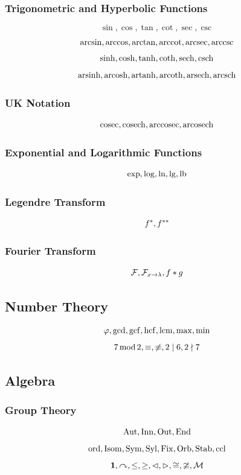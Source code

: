 \documentclass{article}
\begin{document}
\subsubsection{Trigonometric and Hyperbolic Functions}
\[
    \sin, \cos, \tan, \cot, \sec, \csc
\]
\[
    \arcsin, \arccos, \arctan, \arccot, \arcsec, \arccsc
\]
\[
    \sinh, \cosh, \tanh, \coth, \sech, \csch
\]
\[
    \operatorname{arsinh}, \operatorname{arcosh}, \operatorname{artanh}, \operatorname{arcoth}, \operatorname{arsech}, \operatorname{arcsch}
\]

\subsubsection{UK Notation}
\[
    \operatorname{cosec}, \operatorname{cosech}, \operatorname{arccosec}, \operatorname{arcosech}
\]

\subsubsection{Exponential and Logarithmic Functions}
\[
    \exp, \log, \ln, \lg, \operatorname{lb}
\]

\subsubsection{Legendre Transform}
\[
    {f}^{\ast}, {f}^{\ast\ast}
\]

\subsubsection{Fourier Transform}
\[
    \fourier, \fourier[x][\lambda], f \convolution g
\]

\subsection{Number Theory}
\[
    \varphi, \gcd, \operatorname{gcf}, \operatorname{hcf}, \operatorname{lcm}, \max, \min
\]
\[
    7 \operatorname{mod} 2, \equiv, \not\equiv, 2 \mid 6, 2 \nmid 7
\]

\subsection{Algebra}

\subsubsection{Group Theory}
\[
    \operatorname{Aut}, \operatorname{Inn}, \operatorname{Out}, \operatorname{End}
\]
\[
    \operatorname{ord}, \operatorname{Isom}, \operatorname{Sym}, \operatorname{Syl}, \operatorname{Fix}, \operatorname{Orb}, \operatorname{Stab}, \operatorname{ccl}
\]
\[
    \mathbf{1}, \curvearrowright, \leq, \geq, \lhd, \rhd, \cong, \ncong, \mathcal{M}
\]
\end{document}
